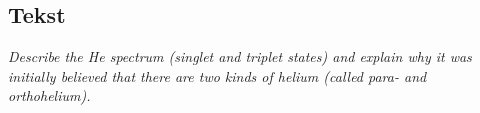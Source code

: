 \subsection{Tekst}

\emph{Describe the He spectrum (singlet and triplet states) and explain why it was initially believed that there are two kinds of helium (called para- and orthohelium).}